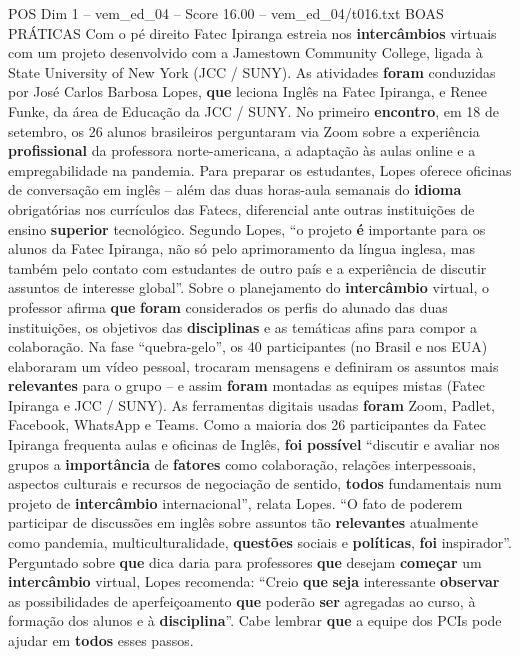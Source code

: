 \begin{textsample}{POS Dim 1 – vem\_ed\_04 – Score 16.00 – vem\_ed\_04/t016.txt}  \label{ex:f1_pos_179}
BOAS PRÁTICAS Com o pé direito Fatec Ipiranga estreia nos \textbf{intercâmbios} virtuais com um projeto desenvolvido com a Jamestown Community College, ligada à State University of New York (JCC / SUNY).
As atividades \textbf{foram} conduzidas por José Carlos Barbosa Lopes, \textbf{que} leciona Inglês na Fatec Ipiranga, e Renee Funke, da área de Educação da JCC / SUNY.
No primeiro \textbf{encontro}, em 18 de setembro, os 26 alunos brasileiros perguntaram via Zoom sobre a experiência \textbf{profissional} da professora norte-americana, a adaptação às aulas online e a empregabilidade na pandemia.
Para preparar os estudantes, Lopes oferece oficinas de conversação em inglês – além das duas horas-aula semanais do \textbf{idioma} obrigatórias nos currículos das Fatecs, diferencial ante outras instituições de ensino \textbf{superior} tecnológico.
Segundo Lopes, “o projeto \textbf{é} importante para os alunos da Fatec Ipiranga, não só pelo aprimoramento da língua inglesa, mas também pelo contato com estudantes de outro país e a experiência de discutir assuntos de interesse global”.
Sobre o planejamento do \textbf{intercâmbio} virtual, o professor afirma \textbf{que} \textbf{foram} considerados os perfis do alunado das duas instituições, os objetivos das \textbf{disciplinas} e as temáticas afins para compor a colaboração.
Na fase “quebra-gelo”, os 40 participantes (no Brasil e nos EUA) elaboraram um vídeo pessoal, trocaram mensagens e definiram os assuntos mais \textbf{relevantes} para o grupo – e assim \textbf{foram} montadas as equipes mistas (Fatec Ipiranga e JCC / SUNY).
As ferramentas digitais usadas \textbf{foram} Zoom, Padlet, Facebook, WhatsApp e Teams.
Como a maioria dos 26 participantes da Fatec Ipiranga frequenta aulas e oficinas de Inglês, \textbf{foi} \textbf{possível} “discutir e avaliar nos grupos a \textbf{importância} de \textbf{fatores} como colaboração, relações interpessoais, aspectos culturais e recursos de negociação de sentido, \textbf{todos} fundamentais num projeto de \textbf{intercâmbio} internacional”, relata Lopes. “O fato de poderem participar de discussões em inglês sobre assuntos tão \textbf{relevantes} atualmente como pandemia, multiculturalidade, \textbf{questões} sociais e \textbf{políticas}, \textbf{foi} inspirador”.
Perguntado sobre \textbf{que} dica daria para professores \textbf{que} desejam \textbf{começar} um \textbf{intercâmbio} virtual, Lopes recomenda: “Creio \textbf{que} \textbf{seja} interessante \textbf{observar} as possibilidades de aperfeiçoamento \textbf{que} poderão \textbf{ser} agregadas ao curso, à formação dos alunos e à \textbf{disciplina}”.
Cabe lembrar \textbf{que} a equipe dos PCIs pode ajudar em \textbf{todos} esses passos.

\end{textsample}
